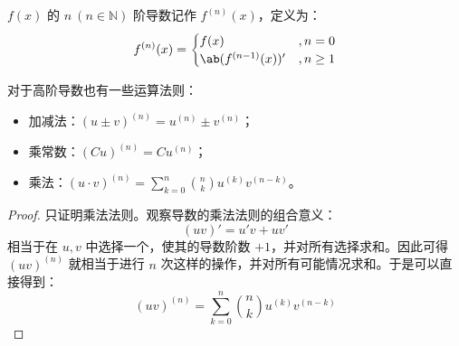 \begin{definition}
	$f(x)$ 的 $n\ (n \in \mathbb{N})$ 阶导数记作 $f^{(n)}(x)$，定义为：
	$$
	f^{(n)}(x) = \begin{cases}
		f(x) & , n = 0 \\
		\ab(f^{(n-1)}(x))' & , n \ge 1
	\end{cases}
	$$
\end{definition}

对于高阶导数也有一些运算法则：

\begin{theorem}[高阶导数运算法则]
	\begin{itemize}
		\item 加减法：$(u \pm v)^{(n)} = u^{(n)} \pm v^{(n)}$；
		\item 乘常数：$(C u)^{(n)} = C u^{(n)}$；
		\item 乘法：$(u \cdot v)^{(n)} = \sum_{k=0}^n \binom{n}{k} u^{(k)} v^{(n - k)}$。
	\end{itemize}

	\begin{proof}
		只证明乘法法则。观察导数的乘法法则的组合意义：
		$$
		(uv)' = u'v + uv'
		$$
		相当于在 $u, v$ 中选择一个，使其的导数阶数 $+1$，并对所有选择求和。因此可得 $(uv)^{(n)}$ 就相当于进行 $n$ 次这样的操作，并对所有可能情况求和。于是可以直接得到：
		$$
		(uv)^{(n)} = \sum_{k=0}^n \binom{n}{k} u^{(k)} v^{(n - k)}
		$$
	\end{proof}
\end{theorem}